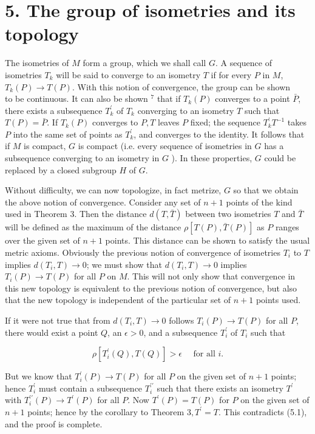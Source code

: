 \documentclass[10pt]{article}
\begin{document}
\section*{5. The group of isometries and its topology}
The isometries of $M$ form a group, which we shall call $G$. A sequence of isometries $T_{k}$ will be said to converge to an isometry $T$ if for every $P$ in $M$, $T_{k}(P) \rightarrow T(P)$. With this notion of convergence, the group can be shown\\
to be continuous. It can also be shown ${ }^{7}$ that if $T_{k}(P)$ converges to a point $\bar{P}$, there exists a subsequence $T_{k}^{\prime}$ of $T_{k}$ converging to an isometry $T$ such that $T(P)=\bar{P}$. If $T_{k}(P)$ converges to $P, T$ leaves $P$ fixed; the sequence $T_{k}^{\prime} T^{-1}$ takes $P$ into the same set of points as $T_{k}^{\prime}$, and converges to the identity. It follows that if $M$ is compact, $G$ is compact (i.e. every sequence of isometries in $G$ has a subsequence converging to an isometry in $G$ ). In these properties, $G$ could be replaced by a closed subgroup $H$ of $G$.

Without difficulty, we can now topologize, in fact metrize, $G$ so that we obtain the above notion of convergence. Consider any set of $n+1$ points of the kind used in Theorem 3. Then the distance $d(T, \bar{T})$ between two isometries $T$ and $\bar{T}$ will be defined as the maximum of the distance $\rho[T(P), \bar{T}(P)]$ as $P$ ranges over the given set of $n+1$ points. This distance can be shown to satisfy the usual metric axioms. Obviously the previous notion of convergence of isometries $T_{i}$ to $T$ implies $d\left(T_{i}, T\right) \rightarrow 0$; we must show that $d\left(T_{i}, T\right) \rightarrow 0$ implies $T_{i}(P) \rightarrow T(P)$ for all $P$ on $M$. This will not only show that convergence in this new topology is equivalent to the previous notion of convergence, but also that the new topology is independent of the particular set of $n+1$ points used.

If it were not true that from $d\left(T_{i}, T\right) \rightarrow 0$ follows $T_{i}(P) \rightarrow T(P)$ for all $P$, there would exist a point $Q$, an $\epsilon>0$, and a subsequence $T_{i}^{\prime}$ of $T_{i}$ such that


\begin{equation*}
\rho\left[T_{i}^{\prime}(Q), T(Q)\right]>\epsilon \quad \text { for all } i . \tag{5.1}
\end{equation*}


But we know that $T_{i}^{\prime}(P) \rightarrow T(P)$ for all $P$ on the given set of $n+1$ points; hence $T_{i}^{\prime}$ must contain a subsequence $T_{i}^{\prime \prime}$ such that there exists an isometry $T^{\prime}$ with $T_{i}^{\prime \prime}(P) \rightarrow T^{\prime}(P)$ for all $P$. Now $T^{\prime}(P)=T(P)$ for $P$ on the given set of $n+1$ points; hence by the corollary to Theorem $3, T^{\prime}=T$. This contradicts (5.1), and the proof is complete.
\end{document}
